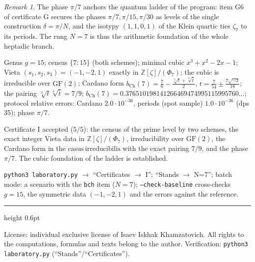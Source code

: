 \documentclass[11pt,a4paper]{article}
\theoremstyle{plain}
\theoremstyle{definition}
\theoremstyle{remark}
\newtheorem{remark}[theorem]{Remark}
\newcommand{\ZZ}{\mathbb{Z}}
\begin{document}
\begin{remark}
The phase $\pi/7$ anchors the quantum ladder of the program: item
G6 of certificate G secures the phases $\pi/7,\pi/15,\pi/30$ as
levels of the single construction $\delta=\pi/N$, and the isotypy
$(1,1,0,1)$ of the Klein quartic ties $\zeta_7$ to its periods.
The rung $N=7$ is thus the arithmetic foundation of the whole
heptadic branch.
\end{remark}

\begin{databox}
Genus $g=15$; census $\{7\colon 15\}$ (both schemes); minimal
cubic $x^3+x^2-2x-1$; Vieta $(s_1,s_2,s_3)=(-1,-2,1)$ exactly in
$\ZZ[\zeta]/(\Phi_7)$; the cubic is irreducible over
$\mathrm{GF}(2)$; Cardano form
$b_{\mathrm{Ch}}(7)=\frac76-\frac{\sqrt[3]{t}+\sqrt[3]{\bar t}}{2}$,
$t=\frac{7}{54}\pm\frac{7\sqrt{-3}}{18}$; the pairing
$\sqrt[3]{t}\sqrt[3]{\bar t}=7/9$;
$b_{\mathrm{Ch}}(7)=0.376510198141266469474995115995760\ldots$;
protocol relative errors: Cardano $2.0\cdot10^{-36}$, periods
(spot sample) $1.0\cdot10^{-36}$ (dps 35); phase $\pi/7$.
\end{databox}

\begin{statusbox}[summary]
Certificate I accepted ($5/5$): the census of the prime level by
two schemes, the exact integer Vieta data in
$\ZZ[\zeta]/(\Phi_7)$, irreducibility over $\mathrm{GF}(2)$, the
Cardano form in the $\mathrm{casus\ irreducibilis}$ with the exact
pairing $7/9$, and the phase $\pi/7$. The cubic foundation of the
ladder is established.
\end{statusbox}

\begin{verifybox}
\texttt{python3 laboratory.py} $\to$ ``Certificates $\to$ I'';
``Stands $\to$ N=7''; batch mode: a scenario with the
\texttt{bch} item ($N=7$); \texttt{--check-baseline} cross-checks
$g=15$, the symmetric data $(-1,-2,1)$ and the errors against the
reference.
\end{verifybox}

\vfill
{\color{linkblue}\hrule height 0.6pt}
\vspace{0.5em}
{\small\color{gray}
License: individual exclusive license of Isaev Iskhak Khamzatovich.
All rights to the computations, formulas and texts belong to the author.
Verification: \texttt{python3 laboratory.py} (``Stands''/``Certificates'').
}
\end{document}
